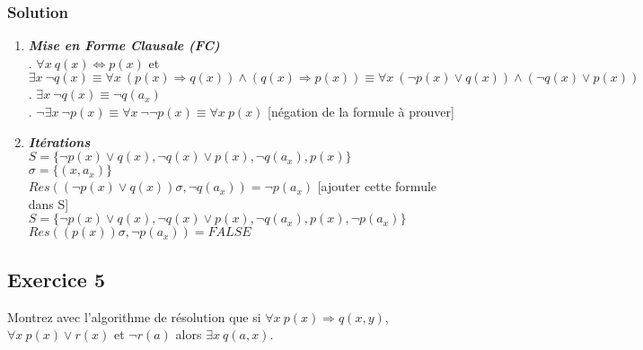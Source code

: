     \subsubsection*{Solution}
    \begin{enumerate}
    
   \item\textbf{\textit{Mise en Forme Clausale (FC)}} \\
    . $\forall x \ q(x) \Leftrightarrow p(x)$ et $\exists x \ \neg q(x) \equiv \forall x \ (p(x) \Rightarrow q(x)) \land (q(x) \Rightarrow p(x)) 
     \equiv \forall x \ (\neg p(x) \lor q(x)) \land (\neg q(x) \lor p(x)) $ \\
    . $\exists x \ \neg q(x) \equiv \neg q(a_{x}) $  \\
    . $\neg \exists x \ \neg p(x) \equiv \forall x \ \neg \neg p(x) \equiv \forall x \ p(x) $ [négation de la formule à prouver] \\
    
    \item \textbf{\textit{Itérations }} \\
    $ S = \{ \neg p(x) \lor q(x) , \neg q(x) \lor p(x) ,  \neg q(a_{x}) , p(x) \}  $ \\
    $ \sigma = \{(x, a_{x}) \} $ \\
    $ Res( (\neg p(x) \lor q(x))\sigma , \neg q(a_{x}) ) = \neg p(a_{x}) $ [ajouter cette formule dans S] \\
    $ S = \{ \neg p(x) \lor q(x) , \neg q(x) \lor p(x) ,  \neg q(a_{x}) , p(x), \neg p(a_{x}) \}$  \\
    $ Res( (p(x))\sigma, \neg p(a_{x}) ) = FALSE $ \\

\end{enumerate}
\subsection*{Exercice 5}
Montrez avec l'algorithme de r\'{e}solution que si $\forall x \ p(x) \Rightarrow q(x, y)$, $\forall x \ p(x) \vee r(x)$ et $\neg r(a)$ alors $\exists x \ q(a, x)$.

